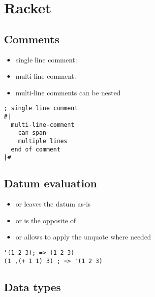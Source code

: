 \documentclass[a4paper,landscape,10pt]{article}
\begin{document}
\section{Racket}
\begin{multicols*}{2}
  \subsection{Comments}

  \begin{itemize}
    \item single line comment: \iracket{;}
    \item multi-line comment: 
    \item multi-line comments can be nested
  \end{itemize}

  \begin{lstlisting}[language=Racket]
; single line comment
#|
  multi-line-comment
	can span
	multiple lines
  end of comment
|#
\end{lstlisting}

  \subsection{Datum evaluation}

  \begin{itemize}
    \item {} or  leaves the datum as-is
    \item {} or  is the opposite of 
    \item {} or  allows to apply the unquote where needed
  \end{itemize}

  \begin{lstlisting}[language=Racket]
'(1 2 3); => (1 2 3)
(1 ,(+ 1 1) 3) ; => '(1 2 3)
\end{lstlisting}

  \subsection{Data types}


\end{multicols*}
\end{document}
